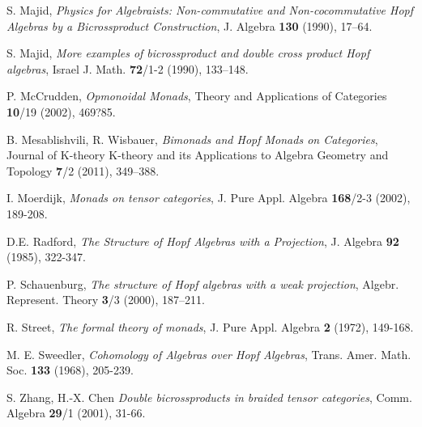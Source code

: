 \documentclass[a4paper, 12pt]{article}
\renewcommand{\_}[1]{\mbox{$_{\left( #1 \right)}$}}
\theoremstyle{plain}
\begin{document}
\begin{thebibliography}{99}
 S. Majid, {\em  Physics for Algebraists: Non-commutative and Non-cocommutative Hopf Algebras by a Bicrossproduct Construction}, J. Algebra 
{\bf 130} (1990), 17--64. 


 S. Majid, {\em  More examples of bicrossproduct and double cross product Hopf algebras}, Israel J. Math. {\bf 72}/1-2 (1990), 133--148. 


 P. McCrudden, {\em Opmonoidal Monads}, Theory and Applications of Categories {\bf 10}/19 (2002), 469?85.


 B. Mesablishvili, R. Wisbauer, {\em Bimonads and Hopf Monads on Categories}, Journal of K-theory K-theory and its Applications to Algebra Geometry and Topology {\bf 7}/2 (2011), 349--388. 


 I. Moerdijk, {\em Monads on tensor categories}, J. Pure Appl. Algebra {\bf 168}/2-3 (2002), 189-208.


 D.E. Radford, {\em The Structure of Hopf Algebras with a Projection}, J. Algebra {\bf 92} (1985), 322-347.


 P. Schauenburg, {\em The structure of Hopf algebras with a weak projection}, Algebr. Represent. Theory {\bf 3}/3 (2000), 187--211.


  R. Street, {\em The formal theory of monads}, J. Pure Appl. Algebra {\bf 2} (1972), 149-168.


 M. E. Sweedler, {\em Cohomology of Algebras over Hopf Algebras}, Trans. Amer. Math. Soc. {\bf 133} (1968), 205-239.


 S. Zhang, H.-X. Chen {\em Double bicrossproducts in braided tensor categories}, Comm. Algebra {\bf 29}/1 (2001), 31-66.       



\end{thebibliography}
\end{document}
